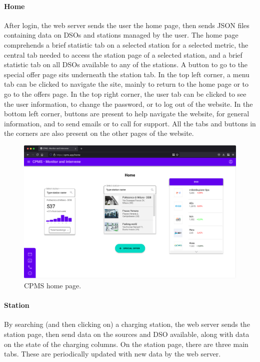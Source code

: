 \paragraph{Home} After login, the web server sends the user the home page, then sends JSON files containing data on DSOs and stations managed by the user. The home page comprehends a brief statistic tab on a selected station for a selected metric, the central tab needed to access the station page of a selected station, and a brief statistic tab on all DSOs available to any of the stations. A button to go to the special offer page sits underneath the station tab. In the top left corner, a menu tab can be clicked to navigate the site, mainly to return to the home page or to go to the offers page. In the top right corner, the user tab can be clicked to see the user information, to change the password, or to log out of the website. In the bottom left corner, buttons are present to help navigate the website, for general information, and to send emails or to call for support. All the tabs and buttons in the corners are also present on the other pages of the website. 

\bigskip
\bigskip
\bigskip
\bigskip

\begin{figure}[h!]
    \centering
    \includegraphics[width=\columnwidth]{./images/mockups/cpms/home}
    \caption{CPMS home page.}
\end{figure}

\pagebreak

\paragraph{Station} By searching (and then clicking on) a charging station, the web server sends the station page, then send data on the sources and DSO available, along with data on the state of the charging columns. On the station page, there are three main tabs. These are periodically updated with new data by the web server. \medskip

